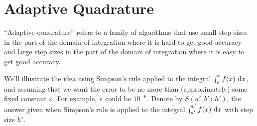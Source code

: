  
\section{Adaptive Quadrature}
``Adaptive quadrature''
refers to a family of algorithms that use small step sizes
in the part of the domain of integration where it is hard to get good
accuracy and large step sizes in the part of the domain of integration
where it is easy to get good accuracy.

We'll illustrate the idea using Simpson's rule applied to the
integral $\int_a^b f(x)\ \mathrm{d}x$, and assuming that we want the error
to be no more than (approximately) some fixed constant $\varepsilon$. 
For example, $\varepsilon$ could be $10^{-6}$. Denote by $S(a',b'\,;\,h')$,
the answer given when Simpson's rule is applied to the integral
$\int_{a'}^{b'} f(x)\ \mathrm{d}x$ with step size $h'$.

